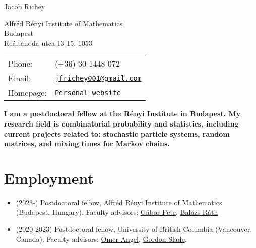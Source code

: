 \documentclass[letterpaper]{article}
\def\name{Jacob Richey}
\begin{document}
{\huge \name}


\vspace{0.25in}

\begin{minipage}{0.45\linewidth}
  \href{https://www.renyi.hu}{Alfréd Rényi Institute of Mathematics} \\
  Budapest \\
  Reáltanoda utca 13-15, 1053 \\
\end{minipage}
\begin{minipage}{0.45\linewidth}
  \begin{tabular}{ll}
    Phone: & (+36) 30 1448 072 \\
    Email: & \href{mailto:jfrichey001@gmail.com}{\tt jfrichey001@gmail.com} \\
    Homepage: & \href{https://jfrichey.github.io/}{\tt Personal website} \\
  \end{tabular}
\end{minipage}

\vspace{1cm} 

\textbf{I am a postdoctoral fellow at the Rényi Institute in Budapest. My research field is combinatorial probability and statistics, including current projects related to: stochastic particle systems, random matrices, and mixing times for Markov chains.}

\section*{Employment}

\begin{itemize} 
  \item (2023-) Postdoctoral fellow, Alfréd Rényi Institute of Mathematics (Budapest, Hungary). \newline Faculty advisors: \href{https://math.bme.hu/~gabor/}{Gábor Pete}, \href{https://math.bme.hu/~rathb/}{Balázs Ráth}
  \item (2020-2023) Postdoctoral fellow, University of British Columbia (Vancouver, Canada). \newline Faculty advisors: \href{https://personal.math.ubc.ca/~angel/}{Omer Angel}, \href{https://personal.math.ubc.ca/~slade/}{Gordon Slade}.
\end{itemize}
\end{document}

